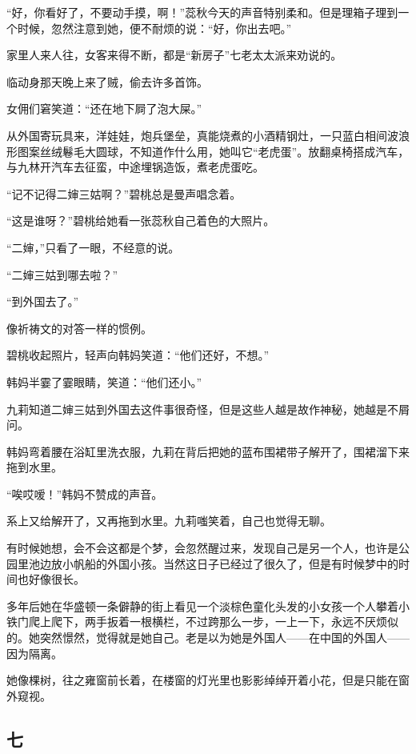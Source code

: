\par “好，你看好了，不要动手摸，啊！”蕊秋今天的声音特别柔和。但是理箱子理到一个时候，忽然注意到她，便不耐烦的说：“好，你出去吧。”
\par 家里人来人往，女客来得不断，都是“新房子”七老太太派来劝说的。
\par 临动身那天晚上来了贼，偷去许多首饰。
\par 女佣们窘笑道：“还在地下屙了泡大屎。”
\par 从外国寄玩具来，洋娃娃，炮兵堡垒，真能烧煮的小酒精钢灶，一只蓝白相间波浪形图案丝绒鬈毛大圆球，不知道作什么用，她叫它“老虎蛋”。放翻桌椅搭成汽车，与九林开汽车去征蛮，中途埋锅造饭，煮老虎蛋吃。
\par “记不记得二婶三姑啊？”碧桃总是曼声唱念着。
\par “这是谁呀？”碧桃给她看一张蕊秋自己着色的大照片。
\par “二婶，”只看了一眼，不经意的说。
\par “二婶三姑到哪去啦？”
\par “到外国去了。”
\par 像祈祷文的对答一样的惯例。
\par 碧桃收起照片，轻声向韩妈笑道：“他们还好，不想。”
\par 韩妈半霎了霎眼睛，笑道：“他们还小。”
\par 九莉知道二婶三姑到外国去这件事很奇怪，但是这些人越是故作神秘，她越是不屑问。
\par 韩妈弯着腰在浴缸里洗衣服，九莉在背后把她的蓝布围裙带子解开了，围裙溜下来拖到水里。
\par “唉哎嗳！”韩妈不赞成的声音。
\par 系上又给解开了，又再拖到水里。九莉嗤笑着，自己也觉得无聊。
\par 有时候她想，会不会这都是个梦，会忽然醒过来，发现自己是另一个人，也许是公园里池边放小帆船的外国小孩。当然这日子已经过了很久了，但是有时候梦中的时间也好像很长。
\par 多年后她在华盛顿一条僻静的街上看见一个淡棕色童化头发的小女孩一个人攀着小铁门爬上爬下，两手扳着一根横栏，不过跨那么一步，一上一下，永远不厌烦似的。她突然憬然，觉得就是她自己。老是以为她是外国人——在中国的外国人——因为隔离。
\par 她像棵树，往之雍窗前长着，在楼窗的灯光里也影影绰绰开着小花，但是只能在窗外窥视。


\subsection{七}

